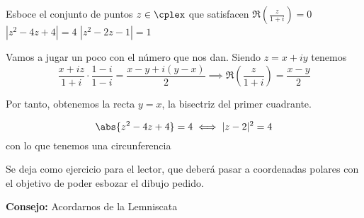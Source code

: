 \begin{problem}[18]
Esboce el conjunto de puntos $z \in \cplex$ que satisfacen
\ppart $\displaystyle \Re\left( \frac{z}{1+i}\right) = 0$
\ppart $\displaystyle |z^2-4z+4| = 4$
\ppart $\displaystyle |z^2-2z-1|=1$

\solution

\spart
Vamos a jugar un poco con el número que nos dan. Siendo $z=x+iy$ tenemos
\[\frac{x+iz}{1+i}\cdot\frac{1-i}{1-i} = \frac{x-y+i(y-x)}{2} \implies \Re\left( \frac{z}{1+i}\right) = \frac{x-y}{2}\]

Por tanto, obtenemos la recta $y=x$, la bisectriz del primer cuadrante.

\spart
\[\abs{z^2-4z+4} = 4 \iff |z-2|^2 = 4 \]
con lo que tenemos una circunferencia

\spart
Se deja como ejercicio para el lector, que deberá pasar a coordenadas polares con el objetivo de poder esbozar el dibujo pedido.

\textbf{Consejo:} Acordarnos de la Lemniscata
\end{problem}

